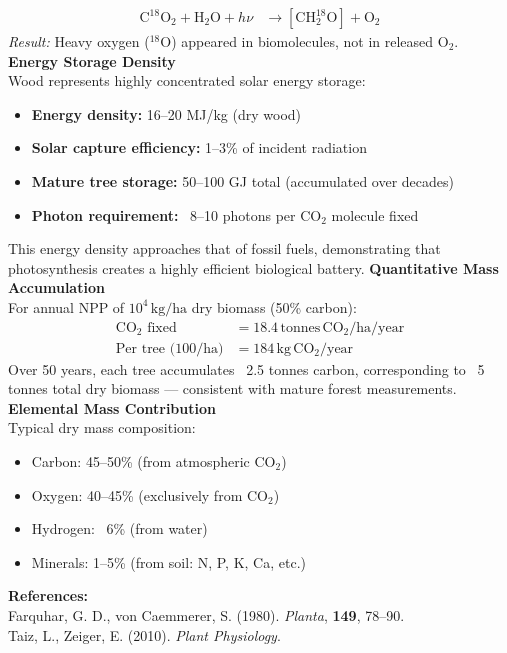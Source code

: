 \begin{technical}
\begin{align}
\mathrm{C}^{18}\mathrm{O}_2 + \mathrm{H}_2\mathrm{O} + h\nu 
&\rightarrow [\mathrm{CH}_2^{18}\mathrm{O}] + \mathrm{O}_2
\end{align}
\textit{Result:} Heavy oxygen ($^{18}\mathrm{O}$) appeared in biomolecules, not in released $\mathrm{O}_2$.
\noindent\textbf{Energy Storage Density}\\
Wood represents highly concentrated solar energy storage:
\begin{itemize}[leftmargin=*]
  \item \textbf{Energy density:} 16–20 MJ/kg (dry wood)
  \item \textbf{Solar capture efficiency:} 1–3\% of incident radiation
  \item \textbf{Mature tree storage:} 50–100 GJ total (accumulated over decades)
  \item \textbf{Photon requirement:} ~8–10 photons per $\mathrm{CO}_2$ molecule fixed
\end{itemize}
This energy density approaches that of fossil fuels, demonstrating that photosynthesis creates a highly efficient biological battery.
\noindent\textbf{Quantitative Mass Accumulation}\\
For annual NPP of $10^4\,\mathrm{kg/ha}$ dry biomass (50\% carbon):
\begin{align}
\text{$\mathrm{CO}_2$ fixed} &= 18.4\,\mathrm{tonnes}\,\mathrm{CO}_2/\mathrm{ha}/\mathrm{year} \\
\text{Per tree (100/ha)} &= 184\,\mathrm{kg}\,\mathrm{CO}_2/\mathrm{year}
\end{align}
Over 50 years, each tree accumulates ~2.5 tonnes carbon, corresponding to ~5 tonnes total dry biomass — consistent with mature forest measurements.
\noindent\textbf{Elemental Mass Contribution}\\
Typical dry mass composition:
\begin{itemize}[leftmargin=*]
  \item Carbon: 45–50\% (from atmospheric $\mathrm{CO}_2$)
  \item Oxygen: 40–45\% (exclusively from $\mathrm{CO}_2$)
  \item Hydrogen: ~6\% (from water)
  \item Minerals: 1–5\% (from soil: N, P, K, Ca, etc.)
\end{itemize}

\noindent\textbf{References:}\\
Farquhar, G. D., von Caemmerer, S. (1980). \textit{Planta}, \textbf{149}, 78–90.\\
Taiz, L., Zeiger, E. (2010). \textit{Plant Physiology}.
\end{technical}
